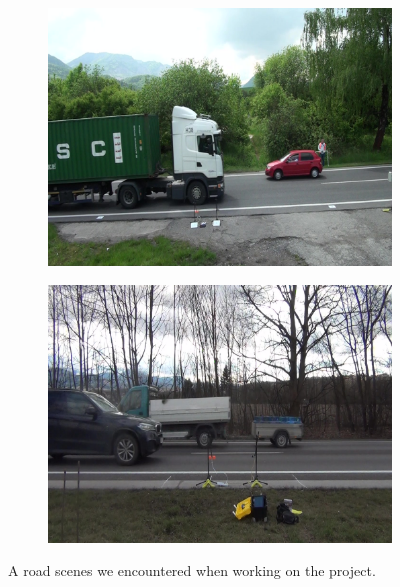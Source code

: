 \begin{figure}[!t]
    \centering
    \begin{subfigure}[b]{0.3\textwidth}
        \centering
        \includegraphics[width=\textwidth]{figures/siamese_tracking/interreg_sample_01.jpg}
        \caption[]{}
    \end{subfigure}
    \begin{subfigure}[b]{0.3\textwidth}
        \centering
        \includegraphics[width=\textwidth]{figures/siamese_tracking/interreg_sample_02.jpg}
        \caption[]{}
    \end{subfigure}
    \caption[Interreg dataset sample]{A road scenes we encountered when working on the \interreg{} project.}
    \label{fig:InterregDatasetSample}
\end{figure}

